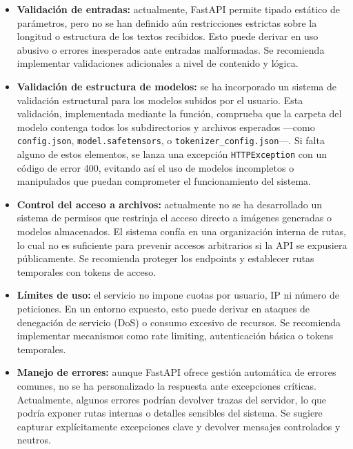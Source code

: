 \begin{itemize}
    \item \textbf{Validación de entradas:} actualmente, FastAPI permite tipado estático de parámetros, pero no se han definido aún restricciones estrictas sobre la longitud o estructura de los textos recibidos. Esto puede derivar en uso abusivo o errores inesperados ante entradas malformadas. Se recomienda implementar validaciones adicionales a nivel de contenido y lógica.
    
    \item \textbf{Validación de estructura de modelos:} se ha incorporado un sistema de validación estructural para los modelos subidos por el usuario. Esta validación, implementada mediante la función, comprueba que la carpeta del modelo contenga todos los subdirectorios y archivos esperados —como \texttt{config.json}, \texttt{model.safetensors}, o \texttt{tokenizer\_config.json}—. Si falta alguno de estos elementos, se lanza una excepción \texttt{HTTPException} con un código de error 400, evitando así el uso de modelos incompletos o manipulados que puedan comprometer el funcionamiento del sistema.

    \item \textbf{Control del acceso a archivos:} actualmente no se ha desarrollado un sistema de permisos que restrinja el acceso directo a imágenes generadas o modelos almacenados. El sistema confía en una organización interna de rutas, lo cual no es suficiente para prevenir accesos arbitrarios si la API se expusiera públicamente. Se recomienda proteger los endpoints y establecer rutas temporales con tokens de acceso.

    \item \textbf{Límites de uso:} el servicio no impone cuotas por usuario, IP ni número de peticiones. En un entorno expuesto, esto puede derivar en ataques de denegación de servicio (DoS) o consumo excesivo de recursos. Se recomienda implementar mecanismos como rate limiting, autenticación básica o tokens temporales.

    \item \textbf{Manejo de errores:} aunque FastAPI ofrece gestión automática de errores comunes, no se ha personalizado la respuesta ante excepciones críticas. Actualmente, algunos errores podrían devolver trazas del servidor, lo que podría exponer rutas internas o detalles sensibles del sistema. Se sugiere capturar explícitamente excepciones clave y devolver mensajes controlados y neutros.
\end{itemize}

